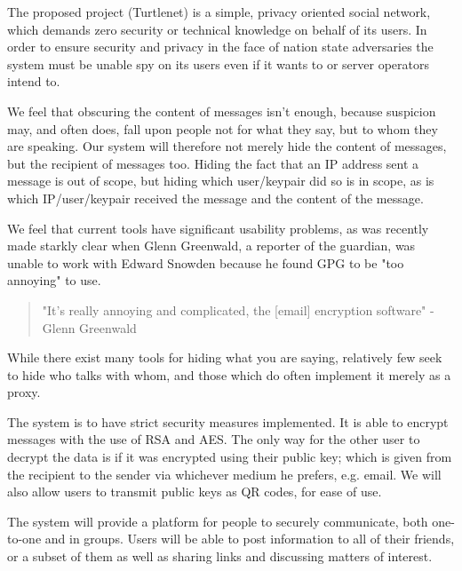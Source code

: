 The proposed project (Turtlenet) is a simple, privacy oriented social
network, which demands zero security or technical knowledge on behalf of its
users. In order to ensure security and privacy in the face of nation state
adversaries the system must be unable spy on its users even if it wants to or
server operators intend to.

We feel that obscuring the content of messages isn't enough, because suspicion
may, and often does, fall upon people not for what they say, but to whom they
are speaking. Our system will therefore not merely hide
the content of messages, but the recipient of messages too. Hiding the fact that
an IP address sent a message is out of scope, but hiding which user/keypair did
so is in scope, as is which IP/user/keypair received the message and the content
of the message.

We feel that current tools have significant usability problems, as was recently
made starkly clear when Glenn Greenwald, a reporter of the guardian, was unable
to work with Edward Snowden because he found GPG to be "too annoying" to use.

\begin{quote}
"It’s really annoying and complicated, the [email] encryption software" - Glenn
Greenwald \cite{greenwaldAnnoying}
\end{quote}

While there exist many tools for hiding what you are saying, relatively few seek
to hide who talks with whom, and those which do often implement it merely as a proxy.

The system is to have strict security measures implemented. It is able to
encrypt messages with the use of RSA and AES. The only way for the other user to
decrypt the data is if it was encrypted using their public key; which is given
from the recipient to the sender via whichever medium he prefers, e.g. email.
We will also allow users to transmit public keys as QR codes, for ease of use.

The system will provide a platform for people to securely communicate, both
one-to-one and in groups. Users will be able to post information to all of their
friends, or a subset of them as well as sharing links and discussing matters of
interest.

